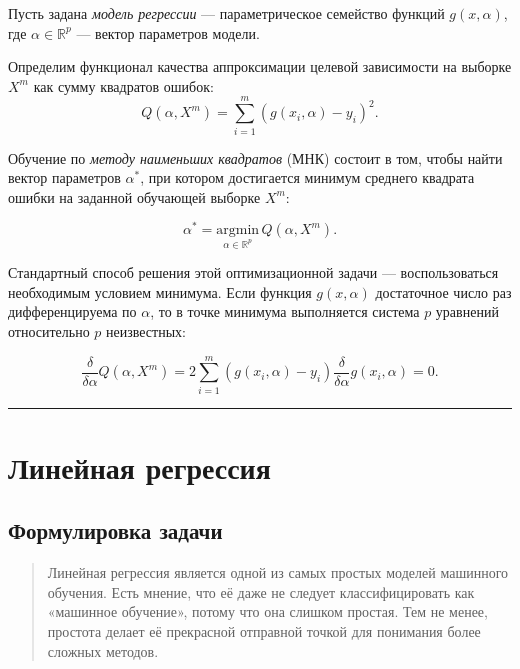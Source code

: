 \documentclass[11pt,a4paper]{article}
\begin{document}
Пусть задана \emph{модель регрессии} --- параметрическое семейство
функций \(g(x,\alpha)\), где \(\alpha \in \mathbb{R}^p\) --- вектор
параметров модели.

Определим функционал качества аппроксимации целевой зависимости на
выборке \(X^m\) как сумму квадратов ошибок:
\[ Q(\alpha, X^m) = \sum_{i=1}^m \left( g(x_i, \alpha) - y_i \right)^2. \]

Обучение по \emph{методу наименьших квадратов} (МНК) состоит в том,
чтобы найти вектор параметров \(\alpha^*\), при котором достигается
минимум среднего квадрата ошибки на заданной обучающей выборке \(X^m\):

\[ \alpha^* = \underset{\alpha \in \mathbb{R}^p}{\mathrm{argmin}} \, {Q(\alpha, X^m)}. \]

Стандартный способ решения этой оптимизационной задачи ---
воспользоваться необходимым условием минимума. Если функция
\(g(x, \alpha)\) достаточное число раз дифференцируема по \(\alpha\), то
в точке минимума выполняется система \(p\) уравнений относительно \(p\)
неизвестных:

\[ \frac{\delta}{\delta \alpha} Q(\alpha, X^m) = 2 \sum_{i=1}^{m} \left( g(x_i, \alpha) -y_i \right) \frac{\delta}{\delta \alpha} g(x_i, \alpha) = 0. \]

    \begin{center}\rule{0.5\linewidth}{0.5pt}\end{center}

    \hypertarget{ux43bux438ux43dux435ux439ux43dux430ux44f-ux440ux435ux433ux440ux435ux441ux441ux438ux44f}{%
\section{Линейная
регрессия}\label{ux43bux438ux43dux435ux439ux43dux430ux44f-ux440ux435ux433ux440ux435ux441ux441ux438ux44f}}

\hypertarget{ux444ux43eux440ux43cux443ux43bux438ux440ux43eux432ux43aux430-ux437ux430ux434ux430ux447ux438}{%
\subsection{Формулировка
задачи}\label{ux444ux43eux440ux43cux443ux43bux438ux440ux43eux432ux43aux430-ux437ux430ux434ux430ux447ux438}}

\begin{quote}
Линейная регрессия является одной из самых простых моделей машинного
обучения. Есть мнение, что её даже не следует классифицировать как
«машинное обучение», потому что она слишком простая. Тем не менее,
простота делает её прекрасной отправной точкой для понимания более
сложных методов.
\end{quote}
\end{document}
